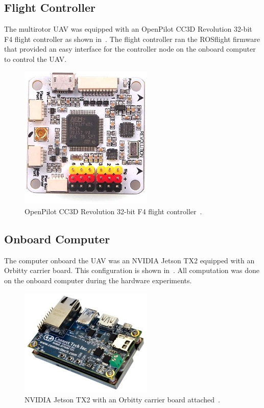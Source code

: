 \subsection{Flight Controller}
The multirotor UAV was equipped with an OpenPilot CC3D Revolution 32-bit F4
flight controller as shown in~. The flight controller ran the
ROSflight firmware that provided an easy interface
for the controller node on the onboard computer to control the UAV.

\begin{figure}[htbp]
  \centering
  \includegraphics[width=2.5in]{figures/f4.jpg}
  \caption[OpenPilot CC3D Revolution 32-bit F4]{OpenPilot CC3D Revolution 32-bit
    F4 flight controller~\cite{openpilotrevo}.
}
%
  \label{fig:f4}
\end{figure}

\subsection{Onboard Computer}
The computer onboard the UAV was an NVIDIA Jetson TX2 equipped with an Orbitty
carrier board. This configuration is shown in~. All
computation was done on the onboard computer during the hardware experiments.

\begin{figure}[h]
  \centering
  \includegraphics[width=2.5in]{figures/tx2_orbitty.jpg}
  \caption[NVIDIA Jetson TX2 with Orbitty Carrier Board]{NVIDIA Jetson TX2
  with an Orbitty carrier board attached~\cite{orbitty}.
  }
  \label{fig:tx2_orbitty}
\end{figure}

